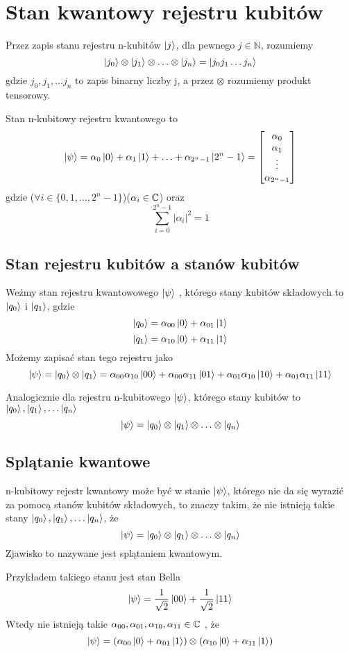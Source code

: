 \section{Stan kwantowy rejestru kubitów}
\begin{definition}
    Przez zapis stanu rejestru n-kubitów $\ket{j}$, dla pewnego $j \in \mathbb{N}$, rozumiemy 
    \[\ket{j_0} \otimes \ket{j_1} \otimes \ldots \otimes \ket{j_n} = \ket{j_0 j_1 \ldots j_n}\]
    gdzie $j_0, j_1, \ldots j_n$ to zapis binarny liczby j, a przez $\otimes$ rozumiemy produkt tensorowy.
\end{definition}
Stan n-kubitowy rejestru kwantowego to
\[
    \ket{\psi} 
    = 
    \alpha_0 \ket{0} + \alpha_1 \ket{1} + \ldots + \alpha_{2^{n} - 1} \ket{2^{n} - 1}
    =
    \begin{bmatrix}
        \alpha_{0} \\
        \alpha_{1} \\
        \vdots \\
        \alpha_{2^n-1}
    \end{bmatrix}
\]
gdzie ($\forall i \in \{0, 1, \ldots, 2^{n} - 1 \}$)($\alpha_i \in \mathbb{C}$) oraz
\[\sum^{2^{n} - 1}_{i = 0} \left|\alpha_i\right|^{2} = 1\]
\subsection{Stan rejestru kubitów a stanów kubitów}
Weźmy stan rejestru kwantowowego $\ket{\psi}$ , którego stany kubitów składowych to $\ket{q_0}$ i $\ket{q_1}$, gdzie
\[\ket{q_0} = \alpha_{00}\ket{0} + \alpha_{01}\ket{1}\]
\[\ket{q_1} = \alpha_{10}\ket{0} + \alpha_{11}\ket{1}\]
Możemy zapisać stan tego rejestru jako
\[\ket{\psi} = \ket{q_0} \otimes \ket{q_1} = \alpha_{00}\alpha_{10}\ket{00} + \alpha_{00}\alpha_{11}\ket{01} + \alpha_{01}\alpha_{10}\ket{10} + \alpha_{01}\alpha_{11}\ket{11}\]
\par Analogicznie dla rejestru n-kubitowego $\ket{\psi}$, którego stany kubitów to $\ket{q_0}, \ket{q_1}, \ldots \ket{q_n}$
\[\ket{\psi} = \ket{q_0} \otimes \ket{q_1} \otimes \ldots \otimes \ket{q_n}\]
\subsection{Splątanie kwantowe}
n-kubitowy rejestr kwantowy może być w stanie $\ket{\psi}$, którego nie da się wyrazić za pomocą stanów kubitów składowych, to znaczy takim, że nie istnieją takie stany $\ket{q_0}, \ket{q_1}, \ldots \ket{q_n}$, że
\[\ket{\psi} = \ket{q_0} \otimes \ket{q_1} \otimes \ldots \otimes \ket{q_n}\]
Zjawisko to nazywane jest splątaniem kwantowym.
\par Przykładem takiego stanu jest stan Bella
\[\ket{\psi} = \frac{1}{\sqrt{2}}\ket{00} + \frac{1}{\sqrt{2}}\ket{11}\]
Wtedy nie istnieją takie $\alpha_{00}, \alpha_{01}, \alpha_{10}, \alpha_{11} \in \mathbb{C}$ , że
\[\ket{\psi} = (\alpha_{00}\ket{0} + \alpha_{01}\ket{1}) \otimes (\alpha_{10}\ket{0} + \alpha_{11}\ket{1})\]
